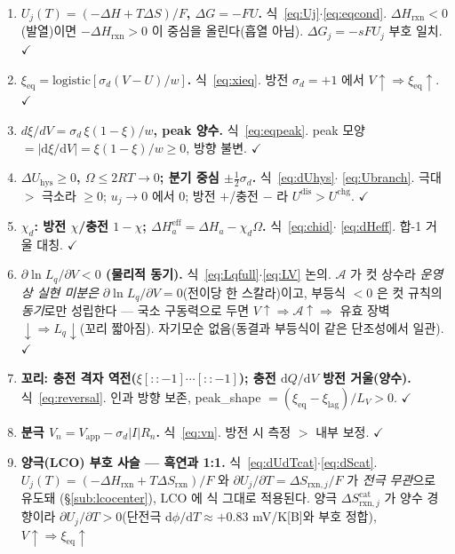\documentclass[11pt,a4paper]{article}
\newcommand{\dd}{\mathrm{d}}
\newcommand{\eff}{\mathrm{eff}}
\newcommand{\eq}{\mathrm{eq}}
\newcommand{\app}{\mathrm{app}}
\newcommand{\rxn}{\mathrm{rxn}}
\newcommand{\dis}{\mathrm{dis}}
\newcommand{\chg}{\mathrm{chg}}
\newcommand{\hys}{\mathrm{hys}}
\newcommand{\cat}{\mathrm{cat}}
\begin{document}
\begin{enumerate}[label=\textbf{S\arabic*.},leftmargin=2.6em,itemsep=2pt]
\item \textbf{$U_j(T)=(-\Delta H+T\Delta S)/F$, $\Delta G=-FU$.} 식~\eqref{eq:Uj}$\cdot$\eqref{eq:eqcond}. $\Delta H_\rxn<0$
(발열)이면 $-\Delta H_\rxn>0$ 이 중심을 올린다(흡열 아님). $\Delta G_j=-sFU_j$ 부호 일치. $\checkmark$
\item \textbf{$\xi_\eq=\mathrm{logistic}[\sigma_d(V-U)/w]$.} 식~\eqref{eq:xieq}. 방전 $\sigma_d=+1$ 에서
$V\!\uparrow\Rightarrow\xi_\eq\!\uparrow$. $\checkmark$
\item \textbf{$d\xi/dV=\sigma_d\,\xi(1-\xi)/w$, peak 양수.} 식~\eqref{eq:eqpeak}. peak 모양 $=|\dd\xi/\dd V|=
\xi(1-\xi)/w\ge0$, 방향 불변. $\checkmark$
\item \textbf{$\Delta U_\hys\ge0$, $\Omega\le2RT\to0$; 분기 중심 $\pm\tfrac12\sigma_d$.} 식~\eqref{eq:dUhys}$\cdot$
\eqref{eq:Ubranch}. 극대 $>$ 극소라 $\ge0$; $u_j\to0$ 에서 $0$; 방전 $+$/충전 $-$ 라 $U^{\dis}>U^{\chg}$. $\checkmark$
\item \textbf{$\chi_d$: 방전 $\chi$/충전 $1-\chi$; $\Delta H_a^\eff=\Delta H_a-\chi_d\Omega$.} 식~\eqref{eq:chid}$\cdot$
\eqref{eq:dHeff}. 합-1 거울 대칭. $\checkmark$
\item \textbf{$\partial\ln L_q/\partial V<0$ (물리적 동기).} 식~\eqref{eq:Lqfull}$\cdot$\eqref{eq:LV} 논의. $\mathcal A$ 가
컷 상수라 \emph{운영상 실현 미분은} $\partial\ln L_q/\partial V=0$(전이당 한 스칼라)이고, 부등식 $<0$ 은 컷 규칙의
\emph{동기}로만 성립한다 — 국소 구동력으로 두면 $V\!\uparrow\Rightarrow\mathcal A\!\uparrow\Rightarrow$ 유효 장벽
$\downarrow\Rightarrow L_q\downarrow$(꼬리 짧아짐). 자기모순 없음(동결과 부등식이 같은 단조성에서 일관). $\checkmark$
\item \textbf{꼬리: 충전 격자 역전($\xi[::-1]\cdots[::-1]$); 충전 $\dd Q/\dd V$ 방전 거울(양수).} 식~\eqref{eq:reversal}.
인과 방향 보존, peak\_shape $=(\xi_\eq-\xi_\mathrm{lag})/L_V>0$. $\checkmark$
\item \textbf{분극 $V_n=V_\app-\sigma_d|I|R_n$.} 식~\eqref{eq:vn}. 방전 시 측정 $>$ 내부 보정. $\checkmark$
\item \textbf{양극(LCO) 부호 사슬 — 흑연과 1:1.} 식~\eqref{eq:dUdTcat}$\cdot$\eqref{eq:dScat}. $U_j(T)=
(-\Delta H_\rxn+T\Delta S_\rxn)/F$ 와 $\partial U_j/\partial T=\Delta S_{\rxn,j}/F$ 가 \emph{전극 무관}으로 유도돼
(\S\ref{sub:lcocenter}), LCO 에 식 그대로 적용된다. 양극 $\Delta S_{\rxn,j}^\cat$ 가 양수 경향이라
$\partial U_j/\partial T>0$(단전극 $\dd\phi/\dd T\approx+0.83$ mV/K[B]와 부호 정합), $V\!\uparrow\Rightarrow\xi_\eq\!\uparrow$

\end{enumerate}
\end{document}
